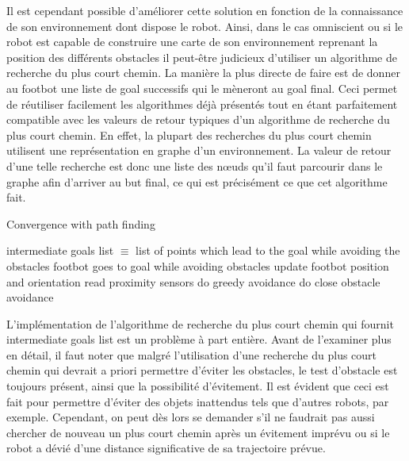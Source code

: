 Il est cependant possible d'améliorer cette solution en fonction de la connaissance de son environnement dont dispose le robot. Ainsi, dans le cas omniscient ou si le robot est capable de construire une carte de son environnement reprenant la position des différents obstacles il peut-être judicieux d'utiliser un algorithme de recherche du plus court chemin. La manière la plus directe de faire est de donner au footbot une liste de goal successifs qui le mèneront au goal final. Ceci  permet de réutiliser facilement les algorithmes déjà présentés tout en étant parfaitement compatible avec les valeurs de retour typiques d'un algorithme de recherche du plus court chemin. En effet, la plupart des recherches du plus court chemin utilisent une représentation en graphe d'un environnement. La valeur de retour d'une telle recherche est donc une liste des nœuds qu'il faut parcourir dans le graphe afin d'arriver au but final, ce qui est précisément ce que cet algorithme fait.
\begin{algorithm}
\caption{Convergence with path finding}
\label{pathConvergence}
\begin{algorithmic}
  \REQUIRE intermediate goals list $\equiv$ list of points which lead to the goal while avoiding the obstacles
  \ENSURE footbot goes to goal while avoiding obstacles
    \STATE update footbot position and orientation
    \STATE read proximity sensors 
      \STATE do greedy avoidance
    \ELSE
      \STATE do close obstacle avoidance
    \ENDIF
  \ENDWHILE
  \ENDFOR
\end{algorithmic}
\end{algorithm}

L'implémentation de l'algorithme de recherche du plus court chemin qui fournit intermediate goals list est un problème à part entière. Avant de l'examiner plus en détail, il faut noter que malgré l'utilisation d'une recherche du plus court chemin qui devrait a priori permettre d'éviter les obstacles, le test d'obstacle est toujours présent, ainsi que la possibilité d'évitement. Il est évident que ceci est fait pour permettre d'éviter des objets inattendus tels que d'autres robots, par exemple. Cependant, on peut dès lors se demander s'il ne faudrait pas aussi chercher de nouveau un plus court chemin après un évitement imprévu ou si le robot a dévié d'une distance significative de sa trajectoire prévue.

